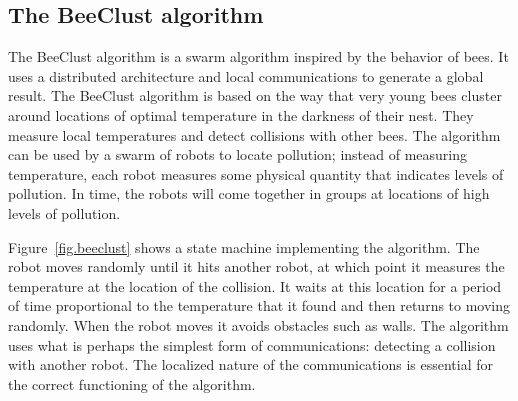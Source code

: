 \begin{figure}
\subfigures
\begin{minipage}{\textwidth}
\hspace{\fill}
\label{fig.coll1}
\label{fig.coll2}
\end{minipage}
\end{figure}

\subsection{The BeeClust algorithm}

The BeeClust algorithm is a swarm algorithm inspired by the behavior of bees. It uses a distributed architecture and local communications to generate a global result. The BeeClust algorithm is based on the way that very young bees cluster around locations of optimal temperature in the darkness of their nest. They measure local temperatures and detect collisions with other bees.  The algorithm can be used by a swarm of robots to locate pollution; instead of measuring temperature, each robot measures some physical quantity that indicates levels of pollution. In time, the robots will come together in groups at locations of high levels of pollution.

Figure~\ref{fig.beeclust} shows a state machine implementing the algorithm. The robot moves randomly until it hits another robot, at which point it measures the temperature at the location of the collision. It waits at this location for a period of time proportional to the temperature that it found and then returns to moving randomly. When the robot moves it avoids obstacles such as walls. The algorithm uses what is perhaps the simplest form of communications: detecting a collision with another robot. The localized nature of the communications is essential for the correct functioning of the algorithm.

